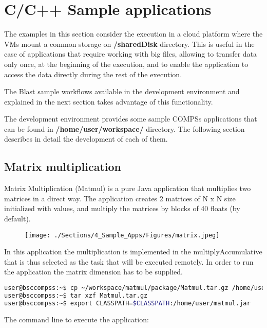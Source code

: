 \section{C/C++ Sample applications}
\label{sec:CSampleApps}

The examples in this section consider the execution in a cloud platform where the VMs mount a common 
storage on {\bf /sharedDisk} directory. This is useful in the case of applications that require working 
with big files, allowing to transfer data only once, at the beginning of the execution, and to enable 
the application to access the data directly during the rest of the execution.

The Blast sample workflows available in the development environment and explained in the next section 
takes advantage of this functionality.

The development environment provides some sample COMPSs applications that can be found in 
{\bf /home/user/workspace/} directory. The following section describes in detail the development 
of each of them.

\subsection{Matrix multiplication}
Matrix Multiplication (Matmul) is a pure Java application that multiplies two matrices in a direct way. 
The application creates 2 matrices of N x N size initialized with values, and multiply the matrices by 
blocks of 40 floats (by default).

\begin{figure}[ht!]
  \centering
    \texttt{[image: ./Sections/4\_Sample\_Apps/Figures/matrix.jpeg]}
\end{figure}

In this application the multiplication is implemented in the multiplyAccumulative that is thus selected 
as the task that will be executed remotely. In order to run the application the matrix dimension has to 
be supplied.

\begin{lstlisting}[language=bash]
user@bsccompss:~$ cp ~/workspace/matmul/package/Matmul.tar.gz /home/user/
user@bsccompss:~$ tar xzf Matmul.tar.gz
user@bsccompss:~$ export CLASSPATH=$CLASSPATH:/home/user/matmul.jar
\end{lstlisting}

The command line to execute the application:

